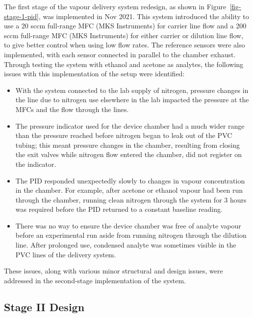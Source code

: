 \documentclass[
  a4paper,
]{scrbook}
\begin{document}
The first stage of the vapour delivery system redesign, as shown in
Figure~\ref{fig-stage-1-pid}, was implemented in Nov 2021. This system
introduced the ability to use a 20 sccm full-range MFC (MKS Instruments)
for carrier line flow and a 200 sccm full-range MFC (MKS Instruments)
for either carrier or dilution line flow, to give better control when
using low flow rates. The reference sensors were also implemented, with
each sensor connected in parallel to the chamber exhaust. Through
testing the system with ethanol and acetone as analytes, the following
issues with this implementation of the setup were identified:

\begin{itemize}
\item
  With the system connected to the lab supply of nitrogen, pressure
  changes in the line due to nitrogen use elsewhere in the lab impacted
  the pressure at the MFCs and the flow through the lines.
\item
  The pressure indicator used for the device chamber had a much wider
  range than the pressure reached before nitrogen began to leak out of
  the PVC tubing; this meant pressure changes in the chamber, resulting
  from closing the exit valves while nitrogen flow entered the chamber,
  did not register on the indicator.
\item
  The PID responded unexpectedly slowly to changes in vapour
  concentration in the chamber. For example, after acetone or ethanol
  vapour had been run through the chamber, running clean nitrogen
  through the system for 3 hours was required before the PID returned to
  a constant baseline reading.
\item
  There was no way to ensure the device chamber was free of analyte
  vapour before an experimental run aside from running nitrogen through
  the dilution line. After prolonged use, condensed analyte was
  sometimes visible in the PVC lines of the delivery system.
\end{itemize}

These issues, along with various minor structural and design issues,
were addressed in the second-stage implementation of the system.

\hypertarget{stage-ii-design}{%
\subsection{Stage II Design}\label{stage-ii-design}}
\end{document}

